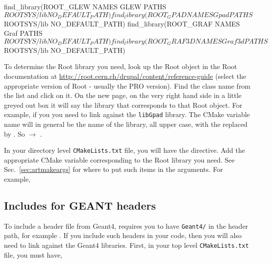 \begin{cpplisting}
find_library(ROOT_GLEW NAMES GLEW PATHS ${ROOTSYS}/lib 
                  NO_DEFAULT_PATH)
find_library(ROOT_GPAD NAMES Gpad PATHS ${ROOTSYS}/lib 
                  NO_DEFAULT_PATH)
find_library(ROOT_GRAF NAMES Graf PATHS ${ROOTSYS}/lib  
                  NO_DEFAULT_PATH)
find_library(ROOT_GRAF3D NAMES Graf3d PATHS ${ROOTSYS}/lib 
                  NO_DEFAULT_PATH)
\end{cpplisting}

To determine the Root library you need, look up the Root object in the Root documentation at \url{http://root.cern.ch/drupal/content/reference-guide} (select the appropriate version of Root - usually the PRO version). Find the class name from the list and click on it. On the new page, on the very right hand side in a little greyed out box it will say the library that corresponds to that Root object. For example, if you  you need to link against the \texttt{libGpad} library. The CMake variable name will in general be the name of the library, all upper case, with the  replaced by . So  $\rightarrow$ .  

In your directory level \texttt{CMakeLists.txt} file, you will have
the  directive. Add the appropriate CMake variable
corresponding to the Root library you need. See
Sec.~\ref{sec:artmakeargs} for where to put such items in the
arguments. For example, 


\subsection{Includes for GEANT headers}
\label{sec:geantincludes}

To include a header file from Geant4, requires you to have
\texttt{Geant4/} in the header path, for example . If you include such headers in your code, then
you will also need to link against the Geant4 libraries. First, in your top level \texttt{CMakeLists.txt} file, you must have,

